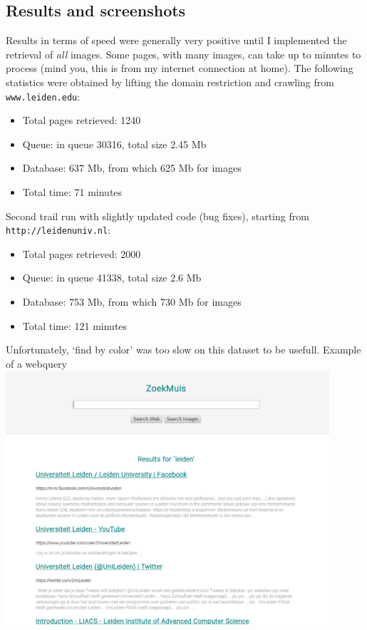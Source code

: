 \documentclass[10pt,a4paper]{article}
\begin{document}
\subsection{Results and screenshots}

Results in terms of speed were generally very positive until I implemented the retrieval of \emph{all} images. Some pages, with many images, can take up to minutes to process (mind you, this is from my internet connection at home). The following statistics were obtained by lifting the domain restriction and crawling from \texttt{www.leiden.edu}:
\begin{itemize}
\item Total pages retrieved: 1240
\item Queue: in queue 30316, total size 2.45 Mb
\item Database: 637 Mb, from which 625 Mb for images
\item Total time: 71 minutes
\end{itemize} 
Second trail run with slightly updated code (bug fixes), starting from \texttt{http://leidenuniv.nl}:
\begin{itemize}
\item Total pages retrieved: 2000
\item Queue: in queue 41338, total size 2.6 Mb
\item Database: 753 Mb, from which 730 Mb for images
\item Total time: 121 minutes
\end{itemize} 
Unfortunately, `find by color' was too slow on this dataset to be usefull.
\newpage
Example of a webquery \newline
\includegraphics[width=12cm]{zoekmuis_web.png}\newline
\end{document}

